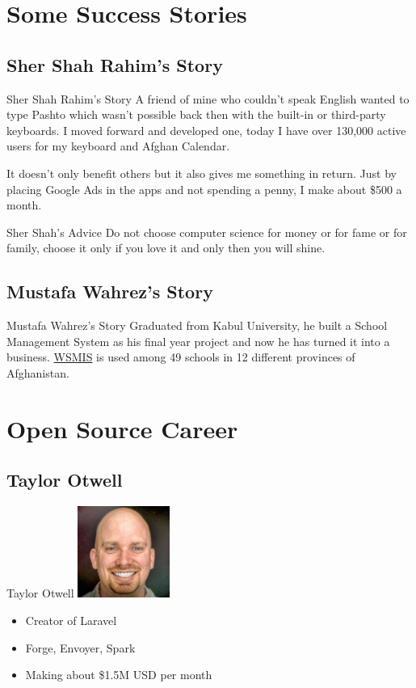 \documentclass{beamer}
\newcommand{\wl}[2]{\href{#1}{\textcolor{UniBlue}{#2}}}
\begin{document}
\section{Some Success Stories}
\subsection{Sher Shah Rahim's Story}
\begin{frame}{Sher Shah Rahim's Story}
	A friend of mine who couldn’t speak English wanted to type Pashto which wasn’t possible back then with the built-in or third-party keyboards. I moved forward and developed one, today I have over 130,000 active users for my keyboard and Afghan Calendar. \newline
	
	It doesn’t only benefit others but it also gives me something in return. Just by placing Google Ads in the apps and not spending a penny, I make about \$500 a month.  
\end{frame}

\begin{frame}{Sher Shah's Advice}
	Do not choose computer science for money or for fame or for family, choose it only if you love it and only then you will shine.
\end{frame}

\subsection{Mustafa Wahrez's Story}
\begin{frame}{Mustafa Wahrez's Story}
	Graduated from Kabul University, he built a School Management System as his final year project and now he has turned it into a business. \wl{http://www.wsmis.com/}{WSMIS} is used among 49 schools in 12 different provinces of Afghanistan.
\end{frame}

\section{Open Source Career}
\subsection{Taylor Otwell}
\begin{frame}{Taylor Otwell}
	\centering
	\includegraphics[width=3cm]{images/taylor.jpg}

	\begin{itemize}
		\item Creator of Laravel
		\item Forge, Envoyer, Spark
		\item Making about \$1.5M USD per month
	\end{itemize}
\end{frame}
\end{document}
